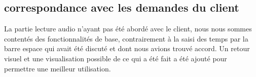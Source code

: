 \subsection{correspondance avec les demandes du client}
La partie lecture audio n'ayant pas été abordé avec le client, nous nous sommes contentés des fonctionnalités de base, contrairement à la saisi des temps par la barre espace qui avait été discuté et dont nous avions trouvé accord. Un retour visuel et une visualisation possible de ce qui a été fait a été ajouté pour permettre une meilleur utilisation.
